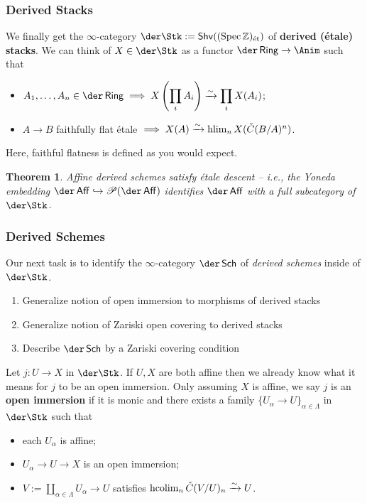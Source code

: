 \documentclass[11pt]{beamer}
\newtheorem*{theorem*}{Theorem}
\begin{document}
\begin{frame}
\frametitle{Derived Stacks}
\pause We finally get the $\infty$-category $\der\Stk:=\Shv((\Spec\Z)_{\et})$ of \textbf{derived (\'{e}tale) stacks}. \pause We can think of $X\in\der\Stk$ as a functor $\der\Ring\to\Anim$ such that
\begin{itemize}
\pause\item $A_1,\ldots,A_n\in\der\Ring\implies X\paren{\displaystyle\prod_iA_i}\xto{\sim}\displaystyle\prod_iX(A_i)$;
\pause\item $A\to B$ faithfully flat \'{e}tale $\implies X(A)\xrightarrow{\sim}\operatorname{hlim}_nX(\check{C}(B/A)^n)$.
\end{itemize}
Here, faithful flatness is defined as you would expect. 

\pause
\begin{theorem*}
Affine derived schemes satisfy \'{e}tale descent -- i.e., the Yoneda embedding $\der\Aff\inj\Pre(\der\Aff)$ identifies $\der\Aff$ with a full subcategory of $\der\Stk$.
\end{theorem*}
\end{frame}

\begin{frame}
\frametitle{Derived Schemes}
\pause Our next task is to identify the $\infty$-category $\der\Sch$ of \emph{derived schemes} inside of $\der\Stk$.
\begin{enumerate}
\pause\item Generalize notion of open immersion to morphisms of derived stacks
\pause\item Generalize notion of Zariski open covering to derived stacks
\pause\item Describe $\der\Sch$ by a Zariski covering condition
\end{enumerate}
\pause Let $j: U\to X$ in $\der\Stk$. If $U,X$ are both affine then we already know what it means for $j$ to be an open immersion. \pause Only assuming $X$ is affine, we say $j$ is an \textbf{open immersion} if it is monic and there exists a family $\{U_{\alpha}\to U\}_{\alpha\in\Lambda}$ in $\der\Stk$ such that 
\begin{itemize}
\pause\item each $U_{\alpha}$ is affine;
\pause\item $U_{\alpha}\to U\to X$ is an open immersion;
\pause\item $V:=\coprod_{\alpha\in\Lambda}U_{\alpha}\to U$ satisfies $\operatorname{hcolim}_n\check{C}(V/U)_n\xrightarrow{\sim}U$.
\end{itemize}
\end{frame}
\end{document}
